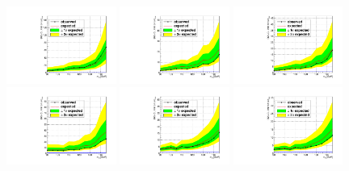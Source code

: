 \begin{figure}
\begin{center}
  \includegraphics[width=0.32\textwidth]{4_Analisys/pics/limits/mmt/mmt_7TeV.pdf}
  \includegraphics[width=0.32\textwidth]{4_Analisys/pics/limits/mmt/mmt_8TeV.pdf}
  \includegraphics[width=0.32\textwidth]{4_Analisys/pics/limits/mmt/mmt.pdf} \\
  \includegraphics[width=0.32\textwidth]{4_Analisys/pics/limits/emt/emt_7TeV.pdf}
  \includegraphics[width=0.32\textwidth]{4_Analisys/pics/limits/emt/emt_8TeV.pdf}
  \includegraphics[width=0.32\textwidth]{4_Analisys/pics/limits/emt/emt.pdf} \\

\end{center}
\end{figure}
